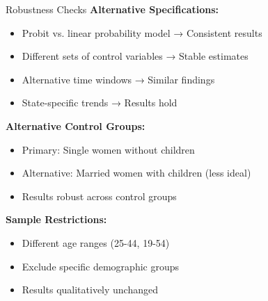 \documentclass[aspectratio=169]{beamer}
\begin{document}
\begin{frame}{Robustness Checks}
\textbf{Alternative Specifications:}
\begin{itemize}
    \item Probit vs. linear probability model → Consistent results
    \item Different sets of control variables → Stable estimates
    \item Alternative time windows → Similar findings
    \item State-specific trends → Results hold
\end{itemize}

\vspace{0.3cm}
\textbf{Alternative Control Groups:}
\begin{itemize}
    \item Primary: Single women without children
    \item Alternative: Married women with children (less ideal)
    \item Results robust across control groups
\end{itemize}

\vspace{0.3cm}
\textbf{Sample Restrictions:}
\begin{itemize}
    \item Different age ranges (25-44, 19-54)
    \item Exclude specific demographic groups
    \item Results qualitatively unchanged
\end{itemize}
\end{frame}
\end{document}
